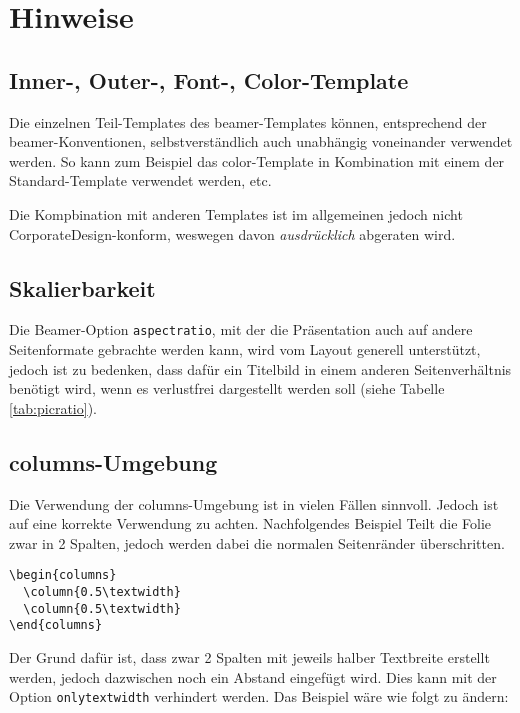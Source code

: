 \section{Hinweise}

\subsection{Inner-, Outer-, Font-, Color-Template}

Die einzelnen Teil-Templates des beamer-Templates können,
entsprechend der beamer-Konventionen, selbstverständlich
auch unabhängig voneinander verwendet werden.
So kann zum Beispiel das color-Template in Kombination mit einem der
Standard-Template verwendet werden, etc.

Die Kompbination mit anderen Templates ist im allgemeinen jedoch nicht
CorporateDesign-konform, weswegen davon \emph{ausdrücklich} abgeraten wird.

\subsection{Skalierbarkeit}

Die Beamer-Option \lstinline{aspectratio}, mit der die Präsentation auch auf
andere Seitenformate gebrachte werden kann, wird vom Layout generell
unterstützt, jedoch ist zu bedenken, dass dafür ein Titelbild in einem anderen
Seitenverhältnis benötigt wird, wenn es verlustfrei dargestellt werden soll
(siehe Tabelle \ref{tab:picratio}).

\subsection{columns-Umgebung}

Die Verwendung der columns-Umgebung ist in vielen Fällen sinnvoll.
Jedoch ist auf eine korrekte Verwendung zu achten.
Nachfolgendes Beispiel Teilt die Folie zwar in 2 Spalten,
jedoch werden dabei die normalen Seitenränder überschritten.

\begin{lstlisting}
\begin{columns}
  \column{0.5\textwidth}
  \column{0.5\textwidth}
\end{columns}
\end{lstlisting}

Der Grund dafür ist, dass zwar 2 Spalten mit jeweils halber Textbreite erstellt
werden, jedoch dazwischen noch ein Abstand eingefügt wird. Dies kann mit der
Option \lstinline{onlytextwidth} verhindert werden.
Das Beispiel wäre wie folgt zu ändern:

